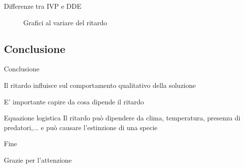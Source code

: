 \documentclass[intlimits]{beamer}
\numberwithin{equation}{section}
\theoremstyle{plain}
\theoremstyle{definition}
\theoremstyle{remark}
\begin{document}
\begin{frame}{Differenze tra IVP e DDE}

\begin{figure}
\centering
\caption{Grafici al variare del ritardo}
\hspace{1mm}
\hspace{1mm}
\end{figure}

\end{frame}

\subsection{Conclusione}

\begin{frame}{Conclusione}

\pause
\begin{block}{}
 Il ritardo influisce sul comportamento qualitativo della soluzione
\end{block}

\pause
\begin{block}{}
 E' importante capire da cosa dipende il ritardo
\end{block}

\pause
\begin{block}{Equazione logistica}
 Il ritardo può dipendere da clima, temperatura, presenza di predatori,... \pause e può causare l'estinzione di una specie
\end{block}

\end{frame}


\begin{frame}{Fine}
 

    \begin{block}{}
    \begin{center}
     \Huge{
     Grazie per l'attenzione
      }
    \end{center}
    \end{block}

\end{frame}
\end{document}
